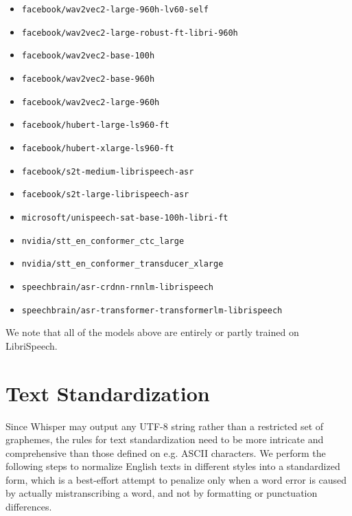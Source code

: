 \documentclass[nohyperref]{article}
\theoremstyle{plain}
\theoremstyle{definition}
\theoremstyle{remark}
\begin{document}
\begin{itemize}
    \item \texttt{facebook/wav2vec2-large-960h-lv60-self} \cite{xu2021complementary}
    \item \texttt{facebook/wav2vec2-large-robust-ft-libri-960h} \cite{hsu2021robust}
    \item \texttt{facebook/wav2vec2-base-100h} \cite{baevski2020wav2vec2}
    \item \texttt{facebook/wav2vec2-base-960h} \cite{baevski2020wav2vec2}
    \item \texttt{facebook/wav2vec2-large-960h} \cite{baevski2020wav2vec2}
    \item \texttt{facebook/hubert-large-ls960-ft} \cite{hsu2021hubert}
    \item \texttt{facebook/hubert-xlarge-ls960-ft} \cite{hsu2021hubert}
    \item \texttt{facebook/s2t-medium-librispeech-asr} \cite{wang2020fairseq}
    \item \texttt{facebook/s2t-large-librispeech-asr} \cite{wang2020fairseq}
    \item \texttt{microsoft/unispeech-sat-base-100h-libri-ft} \cite{chen2022unispeech}
    \item \texttt{nvidia/stt\_en\_conformer\_ctc\_large} \cite{kuchaiev2019nemo}
    \item \texttt{nvidia/stt\_en\_conformer\_transducer\_xlarge} \cite{kuchaiev2019nemo}
    \item \texttt{speechbrain/asr-crdnn-rnnlm-librispeech} \cite{speechbrain}
    \item \texttt{speechbrain/asr-transformer-transformerlm-librispeech} \cite{speechbrain}
\end{itemize}

We note that all of the models above are entirely or partly trained on LibriSpeech.

\vfill
\pagebreak

\section{Text Standardization}\label{sec:standardization}

Since Whisper may output any UTF-8 string rather than a restricted set of graphemes, the rules for text standardization need to be more intricate and comprehensive than those defined on e.g. ASCII characters. We perform the following steps to normalize English texts in different styles into a standardized form, which is a best-effort attempt to penalize only when a word error is caused by actually mistranscribing a word, and not by formatting or punctuation differences.
\end{document}
